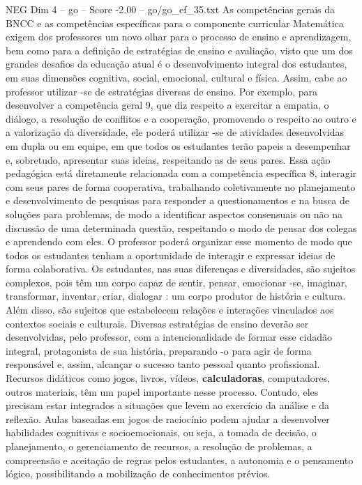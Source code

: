\begin{textsample}{NEG Dim 4 – go – Score -2.00 – go/go\_ef\_35.txt}
As competências gerais da BNCC e as competências específicas para o componente curricular Matemática exigem dos professores um novo olhar para o processo de ensino e aprendizagem, bem como para a definição de estratégias de ensino e avaliação, visto que um dos grandes desafios da educação atual é o desenvolvimento integral dos estudantes, em suas dimensões cognitiva, social, emocional, cultural e física.
Assim, cabe ao professor utilizar -se de estratégias diversas de ensino.
Por exemplo, para desenvolver a competência geral 9, que diz respeito a exercitar a empatia, o diálogo, a resolução de conflitos e a cooperação, promovendo o respeito ao outro e a valorização da diversidade, ele poderá utilizar -se de atividades desenvolvidas em dupla ou em equipe, em que todos os estudantes terão papeis a desempenhar e, sobretudo, apresentar suas ideias, respeitando as de seus pares.
Essa ação pedagógica está diretamente relacionada com a competência específica 8, interagir com seus pares de forma cooperativa, trabalhando coletivamente no planejamento e desenvolvimento de pesquisas para responder a questionamentos e na busca de soluções para problemas, de modo a identificar aspectos consensuais ou não na discussão de uma determinada questão, respeitando o modo de pensar dos colegas e aprendendo com eles.
O professor poderá organizar esse momento de modo que todos os estudantes tenham a oportunidade de interagir e expressar ideias de forma colaborativa.
Os estudantes, nas suas diferenças e diversidades, são sujeitos complexos, pois têm um corpo capaz de sentir, pensar, emocionar -se, imaginar, transformar, inventar, criar, dialogar : um corpo produtor de história e cultura.
Além disso, são sujeitos que estabelecem relações e interações vinculados aos contextos sociais e culturais.
Diversas estratégias de ensino deverão ser desenvolvidas, pelo professor, com a intencionalidade de formar esse cidadão integral, protagonista de sua história, preparando -o para agir de forma responsável e, assim, alcançar o sucesso tanto pessoal quanto profissional.
Recursos didáticos como jogos, livros, vídeos, \textbf{calculadoras}, computadores, outros materiais, têm um papel importante nesse processo.
Contudo, eles precisam estar integrados a situações que levem ao exercício da análise e da reflexão.
Aulas baseadas em jogos de raciocínio podem ajudar a desenvolver habilidades cognitivas e socioemocionais, ou seja, a tomada de decisão, o planejamento, o gerenciamento de recursos, a resolução de problemas, a compreensão e aceitação de regras pelos estudantes, a autonomia e o pensamento lógico, possibilitando a mobilização de conhecimentos prévios.

\end{textsample}
